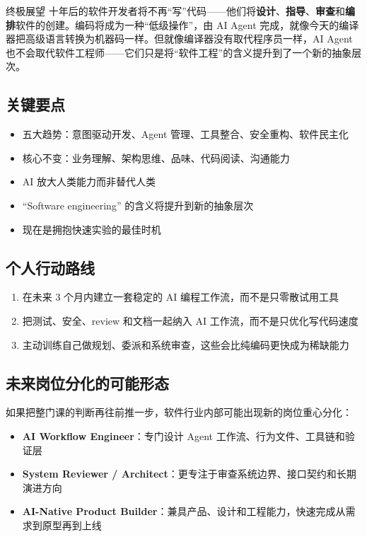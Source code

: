 \documentclass[a4paper]{article}
\begin{document}
\begin{importantbox}{终极展望}
十年后的软件开发者将不再``写''代码——他们将\textbf{设计}、\textbf{指导}、\textbf{审查}和\textbf{编排}软件的创建。编码将成为一种``低级操作''，由 AI Agent 完成，就像今天的编译器把高级语言转换为机器码一样。但就像编译器没有取代程序员一样，AI Agent 也不会取代软件工程师——它们只是将``软件工程''的含义提升到了一个新的抽象层次。
\end{importantbox}

\subsection{关键要点}

\begin{itemize}
    \item 五大趋势：意图驱动开发、Agent 管理、工具整合、安全重构、软件民主化
    \item 核心不变：业务理解、架构思维、品味、代码阅读、沟通能力
    \item AI 放大人类能力而非替代人类
    \item ``Software engineering'' 的含义将提升到新的抽象层次
    \item 现在是拥抱快速实验的最佳时机
\end{itemize}

\subsection{个人行动路线}

\begin{enumerate}
    \item 在未来 3 个月内建立一套稳定的 AI 编程工作流，而不是只零散试用工具
    \item 把测试、安全、review 和文档一起纳入 AI 工作流，而不是只优化写代码速度
    \item 主动训练自己做规划、委派和系统审查，这些会比纯编码更快成为稀缺能力
\end{enumerate}

\subsection{未来岗位分化的可能形态}

如果把整门课的判断再往前推一步，软件行业内部可能出现新的岗位重心分化：

\begin{itemize}
    \item \textbf{AI Workflow Engineer}：专门设计 Agent 工作流、行为文件、工具链和验证层
    \item \textbf{System Reviewer / Architect}：更专注于审查系统边界、接口契约和长期演进方向
    \item \textbf{AI-Native Product Builder}：兼具产品、设计和工程能力，快速完成从需求到原型再到上线
\end{itemize}
\end{document}
